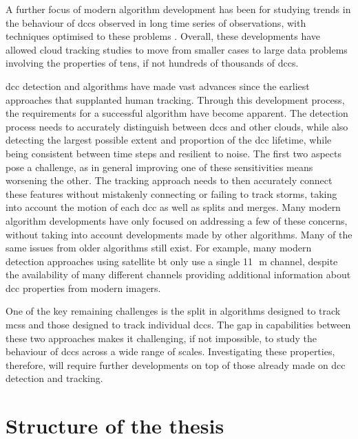 A further focus of modern algorithm development has been for studying trends in the behaviour of \acrshort{dcc}s observed in long time series of observations, with techniques optimised to these problems \citep{ocasio_tracking_2020, hayden_properties_2021}.
Overall, these developments have allowed cloud tracking studies to move from smaller cases to large data problems involving the properties of tens, if not hundreds of thousands of \acrshort{dcc}s.

\acrshort{dcc} detection and algorithms have made vast advances since the earliest approaches that supplanted human tracking.
Through this development process, the requirements for a successful algorithm have become apparent.
The detection process needs to accurately distinguish between \acrshort{dcc}s and other clouds, while also detecting the largest possible extent and proportion of the \acrshort{dcc} lifetime, while being consistent between time steps and resilient to noise.
The first two aspects pose a challenge, as in general improving one of these sensitivities means worsening the other.
The tracking approach needs to then accurately connect these features without mistakenly connecting or failing to track storms, taking into account the motion of each \acrshort{dcc} as well as splits and merges.
Many modern algorithm developments have only focused on addressing a few of these concerns, without taking into account developments made by other algorithms.
Many of the same issues from older algorithms still exist.
For example, many modern detection approaches using satellite \acrshort{bt} only use a single 11\,\unit{\mu m} channel, despite the availability of many different channels providing additional information about \acrshort{dcc} properties from modern imagers.

One of the key remaining challenges is the split in algorithms designed to track \acrshort{mcs}s and those designed to track individual \acrshort{dcc}s.
The gap in capabilities between these two approaches makes it challenging, if not impossible, to study the behaviour of \acrshort{dcc}s across a wide range of scales.
Investigating these properties, therefore, will require further developments on top of those already made on \acrshort{dcc} detection and tracking.


\section{Structure of the thesis}

